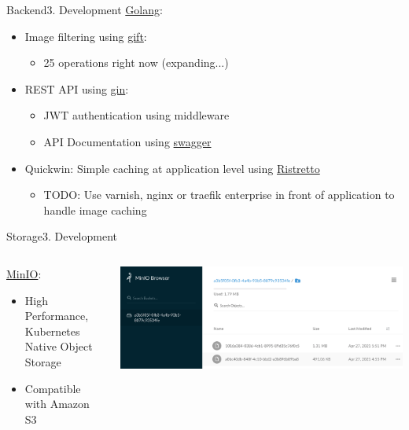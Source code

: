 \documentclass[aspectratio=169,20pt]{beamer}
\begin{document}
\begin{frame}{Backend}{3. Development}
	\underline{Golang}:
	\begin{itemize}
		\item{Image filtering using \href{https://github.com/disintegration/gift}{gift}:}
		\begin{itemize}
			\item{25 operations right now (expanding...)}
		\end{itemize}
		\item{REST API using \href{https://github.com/gin-gonic/gin}{gin}:}
		\begin{itemize}
			\item{JWT authentication using middleware}
			\item{API Documentation using \href{https://github.com/swaggo/swag}{swagger}}
		\end{itemize}
		\item{Quickwin: Simple caching at application level using \href{https://github.com/dgraph-io/ristretto}{Ristretto}}
		\begin{itemize}
			\item{TODO: Use varnish, nginx or traefik enterprise in front of application to handle image caching}
		\end{itemize}
	\end{itemize}
\end{frame}

\begin{frame}{Storage}{3. Development}
	\begin{columns}[onlytextwidth,T]
		\begin{column}{.40\linewidth}
			\underline{MinIO}:
			\vspace{1in}
			\begin{itemize}
				\item{High Performance, Kubernetes Native Object Storage}
				\item{Compatible with Amazon S3}
			\end{itemize}
		\end{column}
		\begin{column}{.60\linewidth}
			\includegraphics[scale=0.45]{minio}
		\end{column}
	\end{columns}
\end{frame}
\end{document}
